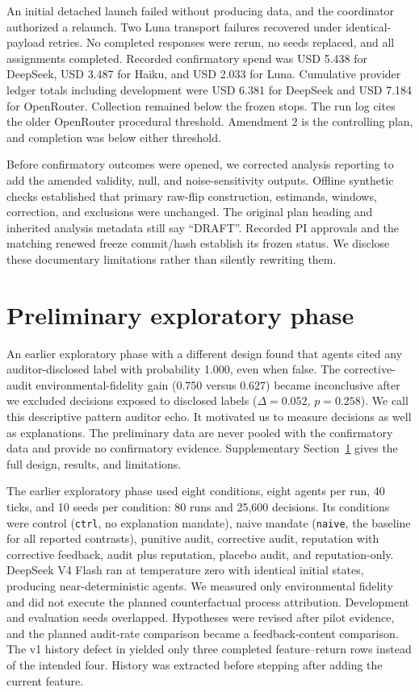 \documentclass[a4paper]{article}
\begin{document}
An initial detached launch failed without producing data, and the coordinator authorized a relaunch. Two Luna transport failures recovered under identical-payload retries. No completed responses were rerun, no seeds replaced, and all assignments completed. Recorded confirmatory spend was USD 5.438 for DeepSeek, USD 3.487 for Haiku, and USD 2.033 for Luna. Cumulative provider ledger totals including development were USD 6.381 for DeepSeek and USD 7.184 for OpenRouter. Collection remained below the frozen stops. The run log cites the older OpenRouter procedural threshold. Amendment 2 is the controlling plan, and completion was below either threshold.

Before confirmatory outcomes were opened, we corrected analysis reporting to add the amended validity, null, and noise-sensitivity outputs. Offline synthetic checks established that primary raw-flip construction, estimands, windows, correction, and exclusions were unchanged. The original plan heading and inherited analysis metadata still say ``DRAFT''. Recorded PI approvals and the matching renewed freeze commit/hash establish its frozen status. We disclose these documentary limitations rather than silently rewriting them.

\section{Preliminary exploratory phase}\label{app:preliminary}
An earlier exploratory phase with a different design found that agents cited any auditor-disclosed label with probability 1.000, even when false. The corrective-audit environmental-fidelity gain (0.750 versus 0.627) became inconclusive after we excluded decisions exposed to disclosed labels ($\Delta=0.052$, $p=0.258$). We call this descriptive pattern auditor echo. It motivated us to measure decisions as well as explanations. The preliminary data are never pooled with the confirmatory data and provide no confirmatory evidence. Supplementary Section~\ref{app:preliminary} gives the full design, results, and limitations.


The earlier exploratory phase used eight conditions, eight agents per run, 40 ticks, and 10 seeds per condition: 80 runs and 25,600 decisions. Its conditions were control (\texttt{ctrl}, no explanation mandate), naive mandate (\texttt{naive}, the baseline for all reported contrasts), punitive audit, corrective audit, reputation with corrective feedback, audit plus reputation, placebo audit, and reputation-only. DeepSeek V4 Flash ran at temperature zero with identical initial states, producing near-deterministic agents. We measured only environmental fidelity and did not execute the planned counterfactual process attribution. Development and evaluation seeds overlapped. Hypotheses were revised after pilot evidence, and the planned audit-rate comparison became a feedback-content comparison. The v1 history defect in  yielded only three completed feature--return rows instead of the intended four. History was extracted before stepping after adding the current feature.
\end{document}
